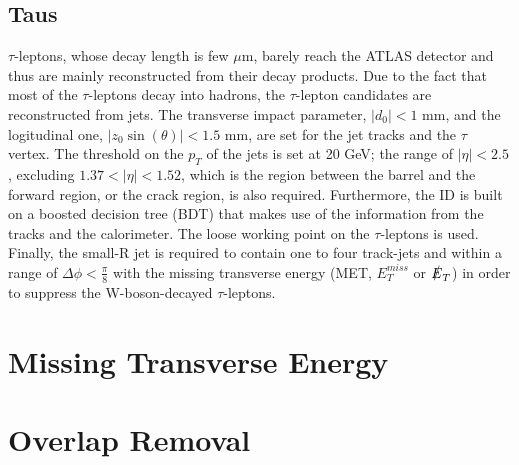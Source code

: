 \documentclass[class=NCU_thesis, crop=false]{standalone}
\begin{document}
	\subsection{Taus}
		$\tau$-leptons, whose decay length is few $\mu$m, barely reach the ATLAS detector and thus are mainly reconstructed from their decay products. Due to the fact that most of the $\tau$-leptons decay into hadrons, the $\tau$-lepton candidates are reconstructed from jets. The transverse impact parameter, $\lvert d_0 \rvert < 1$ mm, and the logitudinal one, $\lvert z_0 \sin(\theta) \rvert < 1.5$ mm, are set for the jet tracks and the $\tau$ vertex. The threshold on the $p_T$ of the jets is set at 20 GeV; the range of $\lvert \eta \rvert < 2.5$, excluding $1.37 < \lvert \eta \rvert < 1.52$, which is the region between the barrel and the forward region, or the crack region, is also required. Furthermore, the ID is built on a boosted decision tree (BDT) that makes use of the information from the tracks and the calorimeter. The loose working point on the $\tau$-leptons is used. Finally, the small-R jet is required to contain one to four track-jets and within a range of $\Delta \phi < \frac{\pi}{8}$ with the missing transverse energy (MET, $E_T^{miss}$ or $\slashed{E}_T$) in order to suppress the W-boson-decayed $\tau$-leptons.
	
\section{Missing Transverse Energy}
	
\section{Overlap Removal}
\end{document}
